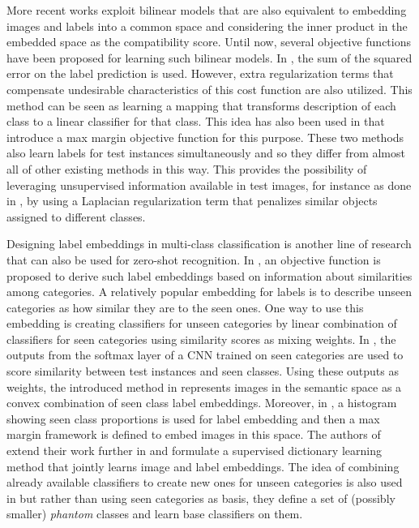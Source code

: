 \documentclass[letterpaper]{article}
\begin{document}
More recent works exploit bilinear models \cite{Yu2013,devise,convex,sse,emb15,semi15} that are also equivalent to embedding images and labels into a
common space and considering the inner product in the embedded space as the compatibility score.
Until now, several objective functions have been proposed for learning such bilinear models.
In \cite{emb15}, the sum of the squared error on the label prediction is used.
However, extra regularization terms that compensate undesirable characteristics of this cost function are also utilized.
This method can be seen as learning a mapping that transforms description of each class to a linear classifier for that class.
This idea has also been used in \cite{li15max,semi15} that introduce a max margin objective function for this purpose.
 These two methods also learn labels for test instances simultaneously and so they differ from almost all of other existing methods in this way. This provides the possibility of
leveraging unsupervised information available in test images, for instance as done in \cite{semi15}, by using a Laplacian regularization term that penalizes similar objects assigned to different classes.

Designing label embeddings in multi-class classification
is another line of research that can also be used for zero-shot recognition.
 In \cite{Yu2013}, an objective function is proposed to derive such label embeddings based on information about similarities among categories.
A relatively popular embedding for labels is to describe unseen categories as how similar they are to the seen ones.
One way to use this embedding is creating classifiers for unseen categories by linear combination of
classifiers for seen categories using similarity scores as mixing weights.
In \cite{convex}, the outputs from the softmax layer of a CNN trained on seen categories are used to score similarity between test instances and seen classes.
Using these outputs as weights, the introduced method in \cite{convex} represents images in the semantic space as a convex combination of seen class label embeddings.
Moreover, in \cite{sse}, a histogram showing seen class proportions is used for label embedding and then a max margin framework is defined to embed images in this space. The authors of \cite{convex} extend their work further in \cite{agnostic} and formulate a supervised dictionary learning method that jointly learns image and label embeddings.
 The idea of combining already available classifiers to create new ones for unseen categories is also used in \cite{Synthesized}
 but rather than using seen categories as basis, they define a set of (possibly smaller) \textit{phantom} classes and learn base classifiers on them.
\end{document}
